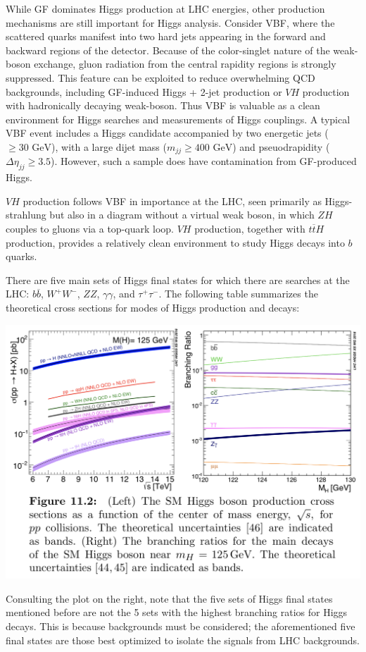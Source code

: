 While GF dominates Higgs production at LHC energies, other production mechanisms are still important for Higgs analysis. Consider VBF, where the scattered quarks manifest into two hard jets appearing in the forward and backward regions of the detector. Because of the color-singlet nature of the weak-boson exchange, gluon radiation from the central rapidity regions is strongly suppressed. This feature can be exploited to reduce overwhelming QCD backgrounds, including GF-induced Higgs + 2-jet production or $VH$ production with hadronically decaying weak-boson. Thus VBF is valuable as a clean environment for Higgs searches and measurements of Higgs couplings. A typical VBF event includes a Higgs candidate accompanied by two energetic jets ($\geq 30 \text{ GeV}$), with a large dijet mass ($m_{jj} \geq 400\text{ GeV}$) and pseuodrapidity ($\Delta\eta_{jj} \geq 3.5$). However, such a sample does have contamination from GF-produced Higgs.

$VH$ production follows VBF in importance at the LHC, seen primarily as Higgs-strahlung but also in a diagram without a virtual weak boson, in which $ZH$ couples to gluons via a top-quark loop. $VH$ production, together with $t\overline{t}H$ production, provides a relatively clean environment to study Higgs decays into $b$ quarks.

\vspace{1em}
\vspace{1em}
There are five main sets of Higgs final states for which there are searches at the LHC: $b\overline{b}$, $W^+W^-$, $ZZ$, $\gamma \gamma$, and $\tau^+\tau^-$. The following table summarizes the theoretical cross sections for modes of Higgs production and decays:

\begin{center}
    \includegraphics[scale=0.4]{physics/images/higgs_cross_sections}
\end{center}
Consulting the plot on the right, note that the five sets of Higgs final states mentioned before are not the 5 sets with the highest branching ratios for Higgs decays. This is because backgrounds must be considered; the aforementioned five final states are those best optimized to isolate the signals from LHC backgrounds.

